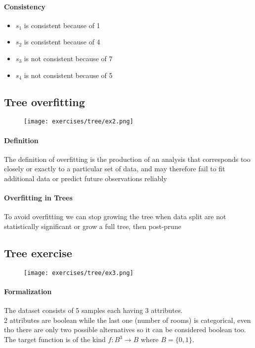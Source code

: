 \paragraph{Consistency}
\begin{itemize}
\item $s_1$ is consistent because of  1 
\item $s_2$ is consistent because of  4
\item $s_3$ is not consistent because of  7 
\item $s_4$ is not consistent because of  5
\end{itemize}

\subsection{Tree overfitting}
\begin{figure}[H]
    \centering
    \texttt{[image: exercises/tree/ex2.png]}
\end{figure}

\paragraph{Definition}
The definition of overfitting is the production of an analysis that corresponds too closely or exactly to a particular set of data, and may therefore fail to fit additional data or predict future observations reliably

\paragraph{Overfitting in Trees}
To avoid overfitting we can stop growing the tree when data split  are not statistically significant  or grow a full tree, then post-prune

\subsection{Tree exercise}
\begin{figure}[H]
    \centering
    \texttt{[image: exercises/tree/ex3.png]}
\end{figure}

\paragraph{Formalization}
The dataset consists of  5 samples each having 3 attributes.\\
2 attributes are boolean while the last one (number of rooms) is categorical, even tho there are only two possible alternatives so it can be considered boolean too.\\
The target function is of the kind $f:B^3 \to B$ where $B=\{0,1\}$.

